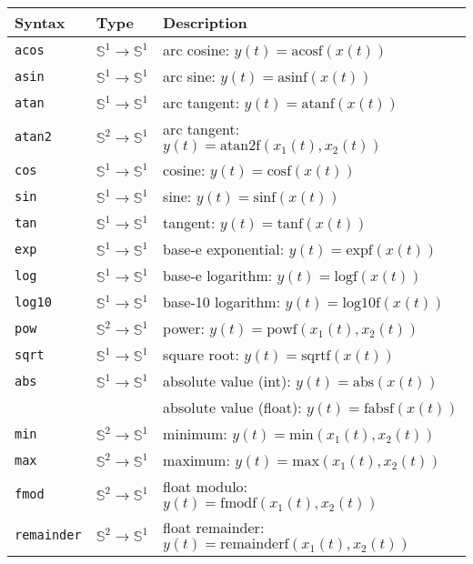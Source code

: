 \begin{tabular}{|l|l|l|}

\hline
\textbf{Syntax} & \textbf{Type}  & \textbf{Description}  \\
\hline

\texttt{acos} & $\mathbb{S}^{1}\rightarrow\mathbb{S}^{1}$ & arc cosine: $y(t)=\mathrm{acosf}(x(t))$  \\
\texttt{asin} & $\mathbb{S}^{1}\rightarrow\mathbb{S}^{1}$ & arc sine: $y(t)=\mathrm{asinf}(x(t))$   \\
\texttt{atan} & $\mathbb{S}^{1}\rightarrow\mathbb{S}^{1}$ & arc tangent: $y(t)=\mathrm{atanf}(x(t))$  \\
\texttt{atan2} & $\mathbb{S}^{2}\rightarrow\mathbb{S}^{1}$ & arc tangent: $y(t)=\mathrm{atan2f}(x_{1}(t), x_{2}(t))$  \\

\texttt{cos} & $\mathbb{S}^{1}\rightarrow\mathbb{S}^{1}$ & cosine: $y(t)=\mathrm{cosf}(x(t))$  \\
\texttt{sin} & $\mathbb{S}^{1}\rightarrow\mathbb{S}^{1}$ & sine: $y(t)=\mathrm{sinf}(x(t))$  \\
\texttt{tan} & $\mathbb{S}^{1}\rightarrow\mathbb{S}^{1}$ & tangent: $y(t)=\mathrm{tanf}(x(t))$  \\

\texttt{exp} & $\mathbb{S}^{1}\rightarrow\mathbb{S}^{1}$ & base-e exponential: $y(t)=\mathrm{expf}(x(t))$  \\
\texttt{log} & $\mathbb{S}^{1}\rightarrow\mathbb{S}^{1}$ & base-e logarithm: $y(t)=\mathrm{logf}(x(t))$  \\
\texttt{log10} & $\mathbb{S}^{1}\rightarrow\mathbb{S}^{1}$ & base-10 logarithm: $y(t)=\mathrm{log10f}(x(t))$  \\
\texttt{pow} & $\mathbb{S}^{2}\rightarrow\mathbb{S}^{1}$ & power: $y(t)=\mathrm{powf}(x_{1}(t),x_{2}(t))$  \\
\texttt{sqrt} & $\mathbb{S}^{1}\rightarrow\mathbb{S}^{1}$ & square root: $y(t)=\mathrm{sqrtf}(x(t))$  \\
\texttt{abs} & $\mathbb{S}^{1}\rightarrow\mathbb{S}^{1}$ & absolute value (int): $y(t)=\mathrm{abs}(x(t))$  \\
			&											 & absolute value (float): $y(t)=\mathrm{fabsf}(x(t))$  \\
\texttt{min} & $\mathbb{S}^{2}\rightarrow\mathbb{S}^{1}$ & minimum: $y(t)=\mathrm{min}(x_{1}(t),x_{2}(t))$   \\
\texttt{max} & $\mathbb{S}^{2}\rightarrow\mathbb{S}^{1}$ & maximum: $y(t)=\mathrm{max}(x_{1}(t),x_{2}(t))$  \\
\texttt{fmod} & $\mathbb{S}^{2}\rightarrow\mathbb{S}^{1}$ & float modulo: $y(t)=\mathrm{fmodf}(x_{1}(t),x_{2}(t))$  \\
\texttt{remainder} & $\mathbb{S}^{2}\rightarrow\mathbb{S}^{1}$ & float remainder: $y(t)=\mathrm{remainderf}(x_{1}(t),x_{2}(t))$  \\


\end{tabular}
